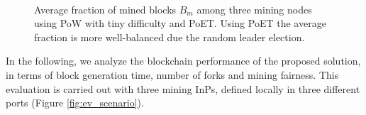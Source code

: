 \begin{figure}[bth]
	\myfloatalign
	 \quad
	 \\
	\caption{Average fraction of mined blocks $B_m$ among three mining nodes using PoW with tiny difficulty and PoET. Using PoET the average fraction is more well-balanced due the random leader election.}
	\label{fig:fairness}
\end{figure}

In the following, we analyze the blockchain performance of the proposed solution, in terms of block generation time, number of forks and mining fairness. This evaluation is carried out with three mining InPs, defined locally in three different ports (Figure \ref{fig:ev_scenario}).

